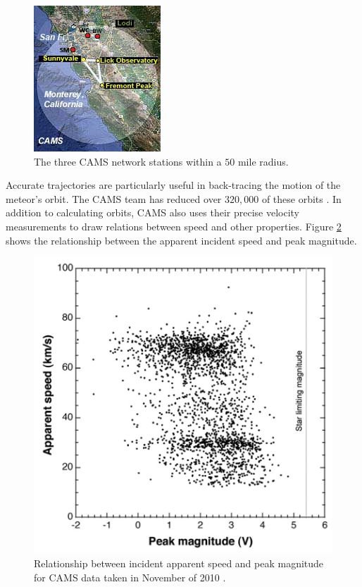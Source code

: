 \begin{figure}[ht!]
  \centering
  \includegraphics[scale=0.7]{images/CAMS_trio.jpg}
  \caption{The three CAMS network stations within a $50$ mile radius.}
  \label{trio}
\end{figure}

Accurate trajectories are particularly useful in back-tracing the motion of the meteor's orbit.  
The CAMS team has reduced over $320,000$ of these orbits \cite{seticams}. 
In addition to calculating orbits, CAMS also uses their precise velocity measurements to draw relations between speed and other properties. 
Figure \ref{fancyCAMS} shows the relationship between the apparent incident speed and peak magnitude.

\begin{figure}[ht!]
  \centering
  \includegraphics[scale=0.6]{images/CAMS_plot.png}
  \caption{Relationship between incident apparent speed and peak magnitude for CAMS data taken in November of 2010 \cite{jenniskens_cams:_2011}.}
  \label{fancyCAMS}
\end{figure}


